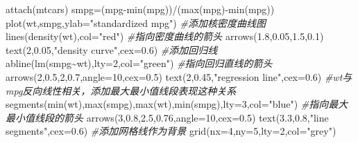 \documentclass[
]{book}
\newenvironment{Shaded}{\begin{snugshade}}{\end{snugshade}}
\newcommand{\AttributeTok}[1]{\textcolor[rgb]{0.77,0.63,0.00}{#1}}
\newcommand{\CommentTok}[1]{\textcolor[rgb]{0.56,0.35,0.01}{\textit{#1}}}
\newcommand{\DecValTok}[1]{\textcolor[rgb]{0.00,0.00,0.81}{#1}}
\newcommand{\FloatTok}[1]{\textcolor[rgb]{0.00,0.00,0.81}{#1}}
\newcommand{\FunctionTok}[1]{\textcolor[rgb]{0.00,0.00,0.00}{#1}}
\newcommand{\NormalTok}[1]{#1}
\newcommand{\OtherTok}[1]{\textcolor[rgb]{0.56,0.35,0.01}{#1}}
\newcommand{\SpecialCharTok}[1]{\textcolor[rgb]{0.00,0.00,0.00}{#1}}
\newcommand{\StringTok}[1]{\textcolor[rgb]{0.31,0.60,0.02}{#1}}
\begin{document}
\begin{Shaded}
\begin{Highlighting}[]
\FunctionTok{attach}\NormalTok{(mtcars)}
\NormalTok{smpg}\OtherTok{=}\NormalTok{(mpg}\SpecialCharTok{{-}}\FunctionTok{min}\NormalTok{(mpg))}\SpecialCharTok{/}\NormalTok{(}\FunctionTok{max}\NormalTok{(mpg)}\SpecialCharTok{{-}}\FunctionTok{min}\NormalTok{(mpg))}
\FunctionTok{plot}\NormalTok{(wt,smpg,}\AttributeTok{ylab=}\StringTok{"standardized mpg"}\NormalTok{)}
\CommentTok{\#添加核密度曲线图}
\FunctionTok{lines}\NormalTok{(}\FunctionTok{density}\NormalTok{(wt),}\AttributeTok{col=}\StringTok{"red"}\NormalTok{)}
\CommentTok{\#指向密度曲线的箭头}
\FunctionTok{arrows}\NormalTok{(}\FloatTok{1.8}\NormalTok{,}\FloatTok{0.05}\NormalTok{,}\FloatTok{1.5}\NormalTok{,}\FloatTok{0.1}\NormalTok{)}
\FunctionTok{text}\NormalTok{(}\DecValTok{2}\NormalTok{,}\FloatTok{0.05}\NormalTok{,}\StringTok{"density curve"}\NormalTok{,}\AttributeTok{cex=}\FloatTok{0.6}\NormalTok{)}
\CommentTok{\#添加回归线}
\FunctionTok{abline}\NormalTok{(}\FunctionTok{lm}\NormalTok{(smpg}\SpecialCharTok{\textasciitilde{}}\NormalTok{wt),}\AttributeTok{lty=}\DecValTok{2}\NormalTok{,}\AttributeTok{col=}\StringTok{"green"}\NormalTok{)}
\CommentTok{\#指向回归直线的箭头}
\FunctionTok{arrows}\NormalTok{(}\DecValTok{2}\NormalTok{,}\FloatTok{0.5}\NormalTok{,}\DecValTok{2}\NormalTok{,}\FloatTok{0.7}\NormalTok{,}\AttributeTok{angle=}\DecValTok{10}\NormalTok{,}\AttributeTok{cex=}\FloatTok{0.5}\NormalTok{)}
\FunctionTok{text}\NormalTok{(}\DecValTok{2}\NormalTok{,}\FloatTok{0.45}\NormalTok{,}\StringTok{"regression line"}\NormalTok{,}\AttributeTok{cex=}\FloatTok{0.6}\NormalTok{)}
\CommentTok{\#wt与mpg反向线性相关，添加最大最小值线段表现这种关系}
\FunctionTok{segments}\NormalTok{(}\FunctionTok{min}\NormalTok{(wt),}\FunctionTok{max}\NormalTok{(smpg),}\FunctionTok{max}\NormalTok{(wt),}\FunctionTok{min}\NormalTok{(smpg),}\AttributeTok{lty=}\DecValTok{3}\NormalTok{,}\AttributeTok{col=}\StringTok{"blue"}\NormalTok{)}
\CommentTok{\#指向最大最小值线段的箭头}
\FunctionTok{arrows}\NormalTok{(}\DecValTok{3}\NormalTok{,}\FloatTok{0.8}\NormalTok{,}\FloatTok{2.5}\NormalTok{,}\FloatTok{0.76}\NormalTok{,}\AttributeTok{angle=}\DecValTok{10}\NormalTok{,}\AttributeTok{cex=}\FloatTok{0.5}\NormalTok{)}
\FunctionTok{text}\NormalTok{(}\FloatTok{3.3}\NormalTok{,}\FloatTok{0.8}\NormalTok{,}\StringTok{"line segments"}\NormalTok{,}\AttributeTok{cex=}\FloatTok{0.6}\NormalTok{)}
\CommentTok{\#添加网格线作为背景}
\FunctionTok{grid}\NormalTok{(}\AttributeTok{nx=}\DecValTok{4}\NormalTok{,}\AttributeTok{ny=}\DecValTok{5}\NormalTok{,}\AttributeTok{lty=}\DecValTok{2}\NormalTok{,}\AttributeTok{col=}\StringTok{"grey"}\NormalTok{)}
\end{Highlighting}
\end{Shaded}
\end{document}
